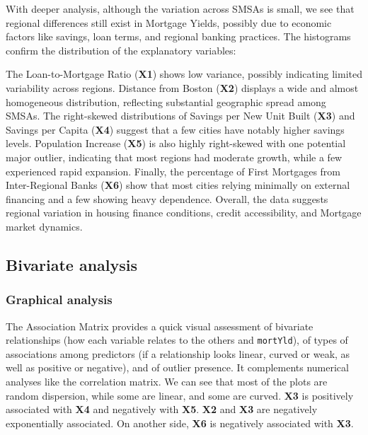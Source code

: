 \documentclass[
  12pt,
]{article}
\begin{document}
With deeper analysis, although the variation across SMSAs is small, we
see that regional differences still exist in Mortgage Yields, possibly
due to economic factors like savings, loan terms, and regional banking
practices. The histograms confirm the distribution of the explanatory
variables:

The Loan-to-Mortgage Ratio (\textbf{X1}) shows low variance, possibly
indicating limited variability across regions. Distance from Boston
(\textbf{X2}) displays a wide and almost homogeneous distribution,
reflecting substantial geographic spread among SMSAs. The right-skewed
distributions of Savings per New Unit Built (\textbf{X3}) and Savings
per Capita (\textbf{X4}) suggest that a few cities have notably higher
savings levels. Population Increase (\textbf{X5}) is also highly
right-skewed with one potential major outlier, indicating that most
regions had moderate growth, while a few experienced rapid expansion.
Finally, the percentage of First Mortgages from Inter-Regional Banks
(\textbf{X6}) show that most cities relying minimally on external
financing and a few showing heavy dependence. Overall, the data suggests
regional variation in housing finance conditions, credit accessibility,
and Mortgage market dynamics.

\subsection{Bivariate analysis}\label{bivariate-analysis}

\subsubsection{Graphical analysis}\label{graphical-analysis-1}

The Association Matrix provides a quick visual assessment of bivariate
relationships (how each variable relates to the others and
\texttt{mortYld}), of types of associations among predictors (if a
relationship looks linear, curved or weak, as well as positive or
negative), and of outlier presence. It complements numerical analyses
like the correlation matrix. We can see that most of the plots are
random dispersion, while some are linear, and some are curved.
\textbf{X3} is positively associated with \textbf{X4} and negatively
with \textbf{X5}. \textbf{X2} and \textbf{X3} are negatively
exponentially associated. On another side, \textbf{X6} is negatively
associated with \textbf{X3}. \vspace{0.5em}
\end{document}
